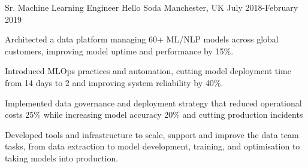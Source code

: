 \begin{cventries}
\cventry
{Sr. Machine Learning Engineer} %
{Hello Soda } %
{Manchester, UK} %
{July 2018-February 2019 } %
{ %
\begin{cvitems}
\item {Architected a data platform managing 60+ ML/NLP models across global customers, improving model uptime and performance by 15\%.}
\item{Introduced MLOps practices and automation, cutting model deployment time from 14 days to 2 and improving system reliability by 40\%.}
\item {Implemented data governance and deployment strategy that reduced operational costs 25\% while increasing model accuracy 20\% and cutting production incidents}
\item{Developed tools and infrastructure to scale, support and improve the data team tasks, from data extraction to model development, training, and optimisation to taking models into production.}
\end{cvitems}
}





\end{cventries}
